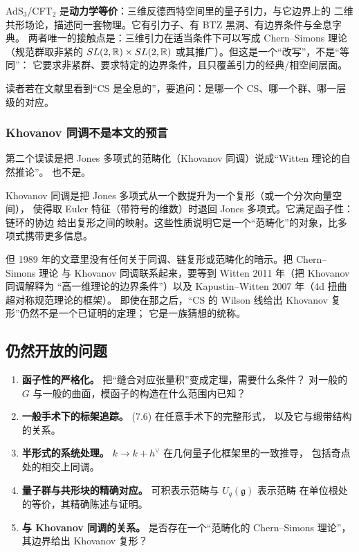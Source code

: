 AdS$_3$/CFT$_2$ 是\textbf{动力学等价}：三维反德西特空间里的量子引力，与它边界上的
二维共形场论，描述同一套物理。它有引力子、有 BTZ 黑洞、有边界条件与全息字典。
两者唯一的接触点是：三维引力在适当条件下可以写成 Chern--Simons 理论
（规范群取非紧的 $SL(2,\mathbb{R})\times SL(2,\mathbb{R})$ 或其推广）。但这是一个“改写”，不是“等同”：
它要求非紧群、要求特定的边界条件，且只覆盖引力的经典/相空间层面。

读者若在文献里看到“CS 是全息的”，要追问：是哪一个 CS、哪一个群、哪一层级的对应。

\subsubsection{Khovanov 同调不是本文的预言}

第二个误读是把 Jones 多项式的范畴化（Khovanov 同调）说成“Witten 理论的自然推论”。
也不是。

Khovanov 同调是把 Jones 多项式从一个数提升为一个复形（或一个分次向量空间），
使得取 Euler 特征（带符号的维数）时退回 Jones 多项式。它满足函子性：链环的协边
给出复形之间的映射。这些性质说明它是一个“范畴化”的对象，比多项式携带更多信息。

但 1989 年的文章里没有任何关于同调、链复形或范畴化的暗示。把 Chern--Simons 理论
与 Khovanov 同调联系起来，要等到 Witten 2011 年（把 Khovanov 同调解释为
“高一维理论的边界条件”）以及 Kapustin--Witten 2007 年（4d 扭曲超对称规范理论的框架）。
即使在那之后，“CS 的 Wilson 线给出 Khovanov 复形”仍然不是一个已证明的定理；
它是一族猜想的统称。

\subsection{仍然开放的问题}

\begin{enumerate}[leftmargin=*]
  \item \textbf{函子性的严格化。} 把“缝合对应张量积”变成定理，需要什么条件？
        对一般的 $G$ 与一般的曲面，模函子的构造在什么范围内已知？
  \item \textbf{一般手术下的标架追踪。} (7.6) 在任意手术下的完整形式，
        以及它与缎带结构的关系。
  \item \textbf{半形式的系统处理。} $k\to k+h^\vee$ 在几何量子化框架里的一致推导，
        包括奇点处的相交上同调。
  \item \textbf{量子群与共形块的精确对应。} 可积表示范畴与 $U_q(\mathfrak g)$ 表示范畴
        在单位根处的等价，其精确陈述与证明。
  \item \textbf{与 Khovanov 同调的关系。} 是否存在一个“范畴化的 Chern--Simons 理论”，
        其边界给出 Khovanov 复形？
\end{enumerate}

